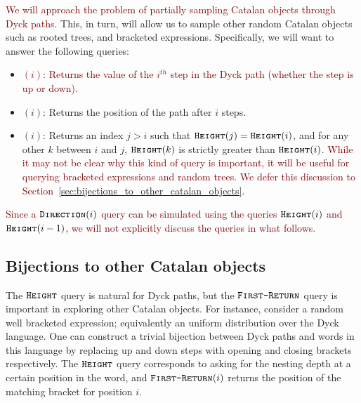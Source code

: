 \textcolor{Maroon}{We will approach the problem of partially sampling Catalan objects through Dyck paths.}
This, in turn, will allow us to sample other random Catalan objects such as rooted trees, and bracketed expressions.
Specifically, we will want to answer the following queries:
\begin{itemize}
    \item \textcolor{Maroon}{$(i)$: Returns the value of the $i^{th}$ step in the Dyck path (whether the step is up or down).}
    \item {}$(i)$: Returns the position of the path after $i$ steps.
    \item {}$(i)$: Returns an index $j>i$ such that $\texttt{\textsc{Height}}(j)=\texttt{\textsc{Height}}(i)$, and for any other $k$ between $i$ and $j$,
    $\texttt{\textsc{Height}}(k)$ is strictly greater than $\texttt{\textsc{Height}}(i)$.
    \textcolor{Maroon}{
    While it may not be clear why this kind of query is important, it will be useful for querying bracketed expressions and random trees.
    We defer this discussion to Section~\ref{sec:bijections_to_other_catalan_objects}.}
\end{itemize}
\textcolor{Maroon}{Since a $\texttt{\textsc{Direction}}(i)$ query can be simulated using the queries $\texttt{\textsc{Height}}(i)$ and $\texttt{\textsc{Height}}(i-1)$,
we will not explicitly discuss the  queries in what follows.}



\subsection{Bijections to other Catalan objects}%
The $\texttt{\textsc{Height}}$ query is natural for Dyck paths, but the $\texttt{\textsc{First-Return}}$ query is important in exploring other Catalan objects.
For instance, consider a random well bracketed expression; equivalently an uniform distribution over the Dyck language.
One can construct a trivial bijection between Dyck paths and words in this language
by replacing up and down steps with opening and closing brackets respectively.
The $\texttt{\textsc{Height}}$ query corresponds to asking for the nesting depth at a certain position in the word,
and $\texttt{\textsc{First-Return}}(i)$ returns the position of the matching bracket for position $i$.

